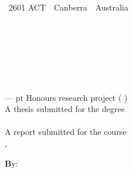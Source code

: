 
%
%


\thispagestyle{empty}



\ifStandardTitle %

\noindent
\begin{minipage}[t]{6cm}%
{\footnotesize%
 \\
~2601 ACT~\textbar~Canberra~\textbar~Australia}
\end{minipage}%
\hfill%
\begin{minipage}[b]{10cm}%
\hfill{}
\end{minipage}


\ \\[2em]
\phantom{x} \hfill\parbox[t]{44.5 mm}{\bfseries \School\\[.5em]
\hfill\mdseries \College}\\[6 em]
\hfill

\noindent
\parbox{140mm}{\sffamily \bfseries \Huge %
\ProjectTitle%
}\\[.75 em]
{--- \ProjectPoints{} pt \ifHonoursThesis Honours \else research \fi project (\Semester{} \Year)}\\[3 em]


\ifHonoursThesis%
A thesis submitted for the degree\\
\emph{\Degree}\\[3 em]
\else%
A report submitted for the course\\
\emph{\CourseCode, \CourseName}\\[3 em]
\fi




\noindent
{\footnotesize \textbf By:}\\
\AuthorName\\[2em]



